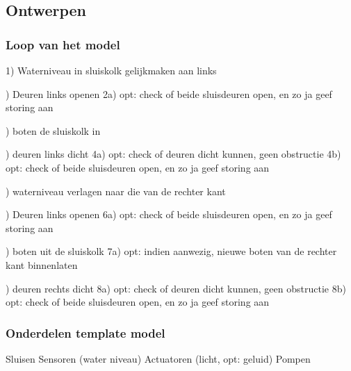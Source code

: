 \documentclass{article}
\begin{document}
\subsection{Ontwerpen}

\subsubsection{Loop van het model}

1) Waterniveau in sluiskolk gelijkmaken aan links \newline 

) Deuren links openen \newline
2a) opt: check of beide sluisdeuren open, en zo ja geef storing aan \newline 

) boten de sluiskolk in \newline

) deuren links dicht \newline
4a) opt: check of deuren dicht kunnen, geen obstructie \newline
4b) opt: check of beide sluisdeuren open, en zo ja geef storing aan \newline 

) waterniveau verlagen naar die van de rechter kant \newline

) Deuren links openen \newline
6a) opt: check of beide sluisdeuren open, en zo ja geef storing aan \newline 

) boten uit de sluiskolk \newline
7a) opt: indien aanwezig, nieuwe boten van de rechter kant binnenlaten \newline

) deuren rechts dicht \newline
8a) opt: check of deuren dicht kunnen, geen obstructie \newline
8b) opt: check of beide sluisdeuren open, en zo ja geef storing aan \newline

\subsubsection{Onderdelen template model}
Sluisen \newline
Sensoren (water niveau) \newline
Actuatoren (licht, opt: geluid) \newline
Pompen
\end{document}
